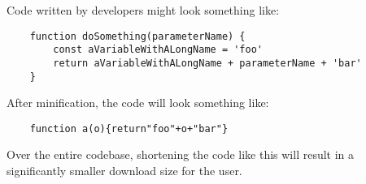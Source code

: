 Code written by developers might look something like:

\begin{verbatim}
    function doSomething(parameterName) {
        const aVariableWithALongName = 'foo'
        return aVariableWithALongName + parameterName + 'bar'
    }
\end{verbatim}

After minification, the code will look something like:

\begin{verbatim}
    function a(o){return"foo"+o+"bar"}
\end{verbatim}

Over the entire codebase, shortening the code like this will result in a significantly smaller download size for the user.
